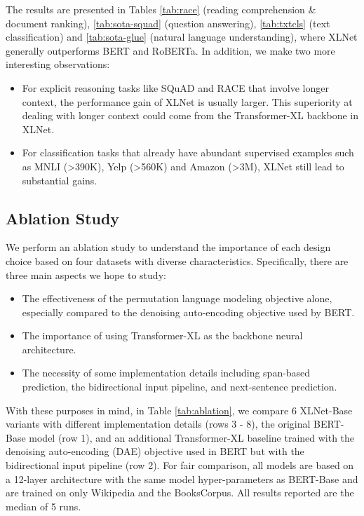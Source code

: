 \documentclass{article}
\begin{document}
The results are presented in Tables \ref{tab:race} (reading comprehension \& document ranking), \ref{tab:sota-squad} (question answering), \ref{tab:txtcls} (text classification) and \ref{tab:sota-glue} (natural language understanding), where XLNet generally outperforms BERT and RoBERTa.
In addition, we make two more interesting observations:
\begin{itemize}[leftmargin=*,itemsep=0em,topsep=0em]
	\item For explicit reasoning tasks like SQuAD and RACE that involve longer context, the performance gain of XLNet is usually larger. This superiority at dealing with longer context could come from the Transformer-XL backbone in XLNet.
	\item For classification tasks that already have abundant supervised examples such as MNLI (>390K), Yelp (>560K) and Amazon (>3M), XLNet still lead to substantial gains.
\end{itemize}



























\subsection{Ablation Study}
\label{sec:ablation}
 
We perform an ablation study to understand the importance of each design choice based on four datasets with diverse characteristics.
Specifically, there are three main aspects we hope to study:
\begin{itemize}[leftmargin=*,itemsep=0em,topsep=0em]
\item The effectiveness of the permutation language modeling objective alone, especially compared to the denoising auto-encoding objective used by BERT.
\item The importance of using Transformer-XL as the backbone neural architecture. 
\item The necessity of some implementation details including span-based prediction, the bidirectional input pipeline, and next-sentence prediction.
\end{itemize}
With these purposes in mind, in Table \ref{tab:ablation}, we compare 6 XLNet-Base variants with different implementation details (rows 3 - 8), the original BERT-Base model (row 1), and an additional Transformer-XL baseline trained with the denoising auto-encoding (DAE) objective used in BERT but with the bidirectional input pipeline (row 2).
For fair comparison, all models are based on a 12-layer architecture with the same model hyper-parameters as BERT-Base and are trained on only Wikipedia and the BooksCorpus.
All results reported are the median of 5 runs.
\end{document}
